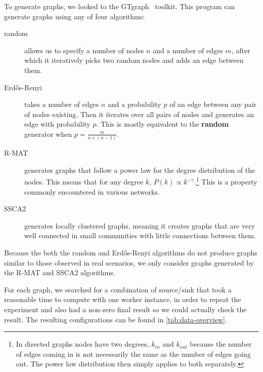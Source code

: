 To generate graphs, we looked to the GTgraph~\cite{bader2006gtgraph} toolkit. This program can generate graphs using any of four algorithms:
\begin{description}
    \item[random] allows us to specify a number of nodes $n$ and a number of edges $m$, after which it iteratively picks two random nodes and adds an edge between them.

    \item[Erd\H{o}s-Renyi] takes a number of edges $n$ and a probability $p$ of an edge between any pair of nodes existing. Then it iterates over all pairs of nodes and generates an edge with probability $p$. This is mostly equivalent to the \textbf{random} generator when $p = \frac{m}{n \times (n - 1)}$.

    \item[R-MAT] generates graphs that follow a power law for the degree distribution of the nodes. This means that for any degree $k$, $P(k) \propto k^{-\gamma}$.\footnote{In directed graphs nodes have two degrees, $k_{in}$ and $k_{out}$ because the number of edges coming in is not necessarily the same as the number of edges going out. The power law distribution then simply applies to both separately.} This is a property commonly encountered in various networks. \cite{newman2005power}

    \item[SSCA2] generates locally clustered graphs, meaning it creates graphs that are very well connected in small communities with little connections between them.
\end{description}

Because the both the random and Erd\H{o}s-Renyi algorithms do not produce graphs similar to those observed in real scenarios, we only consider graphs generated by the R-MAT and SSCA2 algorithms.

For each graph, we searched for a combination of source/sink that took a reasonable time to compute with one worker instance, in order to repeat the experiment and also had a non-zero final result so we could actually check the result. The resulting configurations can be found in \autoref{tab:data-overview}.

